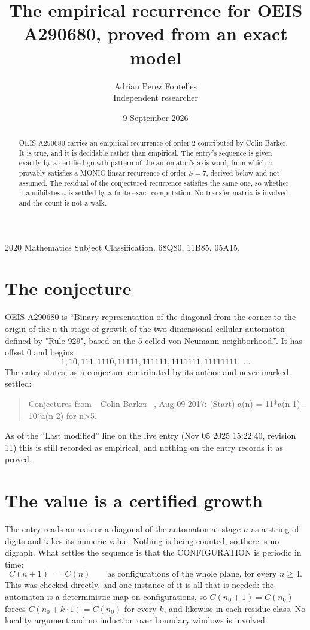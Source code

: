 \documentclass[11pt,a4paper]{article}
\title{The empirical recurrence for OEIS A290680, proved from an exact model}
\author{Adrian Perez Fontelles\\ \small Independent researcher}
\date{9 September 2026}
\theoremstyle{plain}
\theoremstyle{definition}
\begin{document}
\maketitle

\begin{abstract}
OEIS A290680 carries an empirical recurrence of order $2$ contributed by Colin Barker. It is true, and it is
decidable rather than empirical. The entry's sequence is given exactly by a certified growth pattern of the automaton's axis word, from
which $a$ provably satisfies a MONIC linear recurrence of order $S=7$, derived below and not
assumed. The residual of the conjectured recurrence satisfies the same one, so whether it
annihilates $a$ is settled by a finite exact computation. No transfer matrix is involved and
the count is not a walk.
\end{abstract}

\noindent\small 2020 Mathematics Subject Classification. 68Q80, 11B85, 05A15.\normalsize

\section{The conjecture}

OEIS A290680 is ``Binary representation of the diagonal from the corner to the origin of the n-th stage of growth of the two-dimensional cellular automaton defined by "Rule 929", based on the 5-celled von Neumann neighborhood.''. It has offset $0$ and begins
\[
1, 10, 111, 1110, 11111, 111111, 1111111, 11111111,\ \dots
\]
The entry states, as a conjecture contributed by its author and never marked settled:
\begin{quote}
Conjectures from \_Colin Barker\_, Aug 09 2017: (Start) a(n) = 11*a(n-1) - 10*a(n-2) for n>5.
\end{quote}
As of the ``Last modified'' line on the live entry (Nov 05 2025 15:22:40, revision 11)
this is still recorded as empirical, and nothing on the entry records it as proved.

\section{The value is a certified growth}

The entry reads an axis or a diagonal of the automaton at stage $n$ as a string of digits and
takes its numeric value. Nothing is being counted, so there is no digraph. What settles the
sequence is that the CONFIGURATION is periodic in time:
\[
C(n+1)\;=\;C(n)\qquad\text{as configurations of the whole plane, for every } n\ge 4.
\]
This was checked directly, and one instance of it is all that is needed: the automaton is a
deterministic map on configurations, so $C(n_0+1)=C(n_0)$ forces $C(n_0+k\cdot1)=C(n_0)$ for
every $k$, and likewise in each residue class. No locality argument and no induction over
boundary windows is involved.
\end{document}
